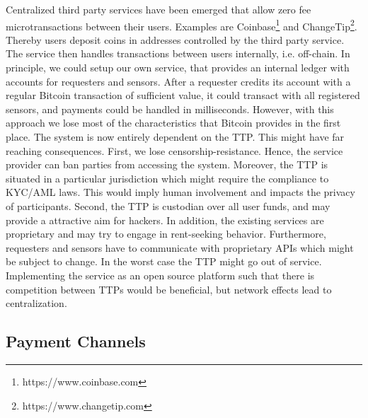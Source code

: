 Centralized third party services have been emerged that allow zero fee microtransactions between their users. Examples are Coinbase\footnote{https://www.coinbase.com} and ChangeTip\footnote{https://www.changetip.com}. Thereby users deposit coins in addresses controlled by the third party service. The service then handles transactions between users internally, i.e. off-chain. In principle, we could setup our own service, that provides an internal ledger with accounts for requesters and sensors. After a requester credits its account with a regular Bitcoin transaction of sufficient value, it could transact with all registered sensors, and payments could be handled in milliseconds. However, with this approach we lose most of the characteristics that Bitcoin provides in the first place. The system is now entirely dependent on the \ac{TTP}. This might have far reaching consequences. First, we lose censorship-resistance. Hence, the service provider can ban parties from accessing the system. Moreover, the \ac{TTP} is situated in a particular jurisdiction which might require the compliance to \ac{KYC}/\ac{AML} laws. This would imply human involvement and impacts the privacy of participants. Second, the \ac{TTP} is custodian over all user funds, and may provide a attractive aim for hackers. In addition, the existing services are proprietary and may try to engage in rent-seeking behavior. Furthermore, requesters and sensors have to communicate with proprietary \ac{API}s which might be subject to change. In the worst case the \ac{TTP} might go out of service. Implementing the service as an open source platform such that there is competition between \ac{TTP}s would be beneficial, but network effects lead to centralization.


\subsection{Payment Channels}

